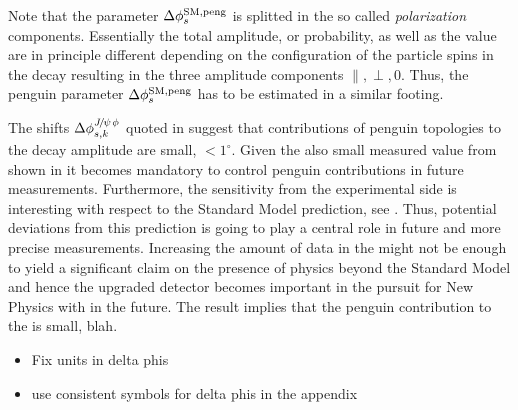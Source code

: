 \noindent Note that the parameter $\Delta\phi_{s}^{\tiny\text{SM,peng}}$ is splitted in the so called {\it polarization}
components. Essentially the total \BsJpsiPhi amplitude, or probability, as well as the \phis value
are in principle different depending on the configuration of the particle spins in the \BsJpsiPhi
decay resulting in the three amplitude components $\parallel,\perp,0$. Thus, the penguin parameter
$\Delta\phi_{s}^{\tiny\text{SM,peng}}$ has to be estimated in a similar footing.

The shifts $\Delta\phi^{{J\mskip -3mu/\mskip -2mu\psi\mskip 2mu}\phi}_{s,{k}}$ quoted in 
suggest that contributions of penguin topologies to the \BsJpsiPhi decay amplitude are
small, $<1^\circ$. Given the also small \phis measured value from \lhcb shown in 
it becomes mandatory to control penguin contributions in future \phis measurements.
Furthermore, the sensitivity from the experimental side is interesting with respect to
the Standard Model prediction, see . Thus, potential deviations from this
prediction is going to play a central role in future and more precise \phis measurements.
Increasing the amount of data in the \lhc \runtwo might not be enough to yield
a significant claim on the presence of physics beyond the Standard Model and hence
the upgraded \lhcb detector becomes important in the pursuit for New Physics with \phis in the future.
The result implies that the penguin contribution to the \phis is small, blah.



\begin{itemize}
  \item Fix units in delta phis
  \item use consistent symbols for delta phis in the appendix
\end{itemize}
